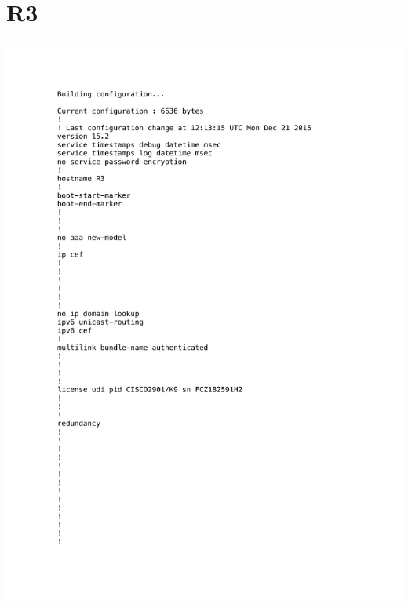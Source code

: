 \documentclass[11pt,a4paper]{scrreprt}
\begin{document}
\section{R3}
\vspace{-1cm}
\includegraphics[height=\dimexpr\textheight-4\baselineskip\relax,page=1]{../config_files/R3.pdf}

\end{document}
